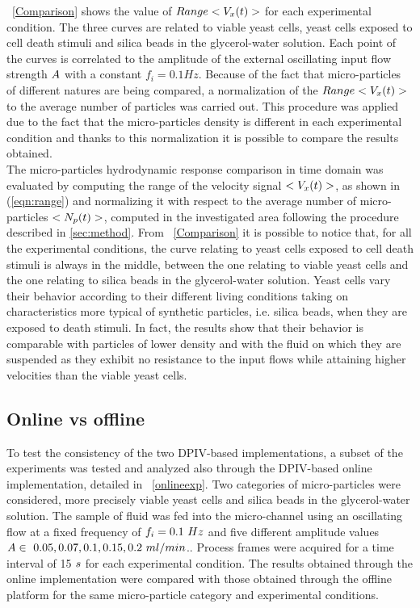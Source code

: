 \documentclass[journal]{IEEEtran}
\theoremstyle{definition}
\theoremstyle{remark}
\begin{document}
~\fig\ref{Comparison} shows the value of $Range<V_x(t)>$ for each experimental condition. The three curves are related to viable yeast cells, yeast cells exposed to cell death stimuli and silica beads in the glycerol-water solution. Each point of the curves is correlated to the amplitude of the external oscillating input flow strength $A$ with a constant  $f_i= 0.1 Hz$. 
Because of the fact that micro-particles of different natures are being compared, a normalization of the $Range<V_x(t)>$ to the average number of particles was carried out. This procedure was applied due to the fact that the micro-particles density is different in each experimental condition and thanks to this normalization it is possible to compare the results obtained. 
\\The micro-particles hydrodynamic response comparison in time domain was evaluated by computing the range of the velocity signal $<V_{x}(t)>$, as shown in \eqn(\ref{eqn:range}) and normalizing it with respect to the average number of micro-particles $<N_p(t)>$, computed in the investigated area following the procedure described in \sect\ref{sec:method}.
From ~\fig\ref{Comparison} it is possible to notice that, for all the experimental conditions, the curve relating to yeast cells exposed to cell death stimuli is always in the middle, between the one relating to viable yeast cells and the one relating to silica beads in the glycerol-water solution.
Yeast cells vary their behavior according to their different living conditions taking on characteristics more typical of synthetic particles, i.e. silica beads, when they are exposed to death stimuli. In fact, the results show that their behavior is comparable with particles of lower density and with the fluid on which they are suspended as they exhibit no resistance to the input flows while attaining higher velocities than the viable yeast cells.

\subsection{Online vs offline}\label{sec:OnlineOffline}
To test the consistency of the two DPIV-based implementations, a subset of the experiments was tested and analyzed also through the DPIV-based online implementation, detailed in ~\tab\ref{onlineexp}. Two categories of micro-particles were considered, more precisely viable yeast cells and silica beads in the glycerol-water solution. The sample of fluid was fed into the micro-channel using an oscillating flow at a fixed frequency of $f_i=0.1~Hz$ and five different amplitude values $A\in~{0.05, 0.07, 0.1, 0.15, 0.2~ml/min}$.. Process frames were acquired for a time interval of 15 $s$ for each experimental condition. 
The results obtained through the online implementation were compared with those obtained through the offline platform for the same micro-particle category and experimental conditions.
\end{document}
